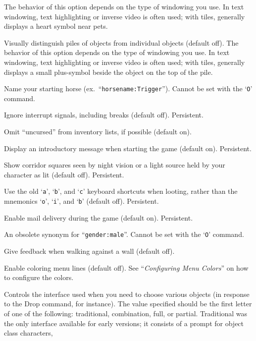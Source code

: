 The behavior of this option depends on the type of windowing you use.
In text windowing, text highlighting or inverse video is often used;
with tiles, generally displays a heart symbol near pets.
\item[\ib{hilite\verb+_+pile}]
Visually distinguish piles of objects from individual objects (default off).
The behavior of this option depends on the type of windowing you use.
In text windowing, text highlighting or inverse video is often used;
with tiles, generally displays a small plus-symbol beside the object
on the top of the pile.
\item[\ib{horsename}]
Name your starting horse (ex.\ ``{\tt horsename:Trigger}'').
Cannot be set with the `{\tt O}' command.
\item[\ib{ignintr}]
Ignore interrupt signals, including breaks (default off).  Persistent.
\item[\ib{implicit\verb+_+uncursed}]
Omit ``uncursed'' from inventory lists, if possible (default on).
\item[\ib{legacy}]
Display an introductory message when starting the game (default on).
Persistent.
\item[\ib{lit\verb+_+corridor}]
Show corridor squares seen by night vision or a light source held by your
character as lit (default off).  Persistent.
\item[\ib{lootabc}]
Use the old `{\tt a}', `{\tt b}', and `{\tt c}' keyboard shortcuts when
looting, rather than the mnemonics `{\tt o}', `{\tt i}', and `{\tt b}' (default off).
Persistent.
\item[\ib{mail}]
Enable mail delivery during the game (default on).  Persistent.
\item[\ib{male}]
An obsolete synonym for ``{\tt gender:male}''.  Cannot be set with the
`{\tt O}' command.
\item[\ib{mention\verb+_+walls}]
Give feedback when walking against a wall (default off).
\item[\ib{menucolors}]
Enable coloring menu lines (default off).
See ``{\it Configuring Menu Colors\/}'' on how to configure the colors.
\item[\ib{menustyle}]
Controls the interface used when you need to choose various objects (in
response to the Drop command, for instance).  The value specified should
be the first letter of one of the following:  traditional, combination,
full, or partial.
Traditional was the only interface available for
early versions; it consists of a prompt for object class characters,
